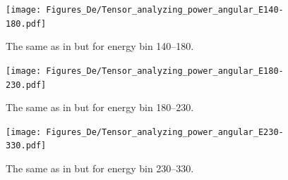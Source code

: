         

    \begin{figure}[h]
        \begin{center}
        \texttt{[image: Figures\_De/Tensor\_analyzing\_power\_angular\_E140-180.pdf]}
        \end{center}
        \caption{The same as in  but for energy bin \SIrange{140}{180}{\mev}.}
        \label{tensor_angular_140-180}
    \end{figure}
        

    \begin{figure}[h]
        \begin{center}
        \texttt{[image: Figures\_De/Tensor\_analyzing\_power\_angular\_E180-230.pdf]}
        \end{center}
        \caption{The same as in  but for energy bin \SIrange{180}{230}{\mev}.}
        \label{tensor_angular_180-230}
    \end{figure}

    \begin{figure}[h]
        \begin{center}
        \texttt{[image: Figures\_De/Tensor\_analyzing\_power\_angular\_E230-330.pdf]}
        \end{center}
        \caption{The same as in  but for energy bin \SIrange{230}{330}{\mev}.}
        \label{tensor_angular_230-330}
    \end{figure}
        


